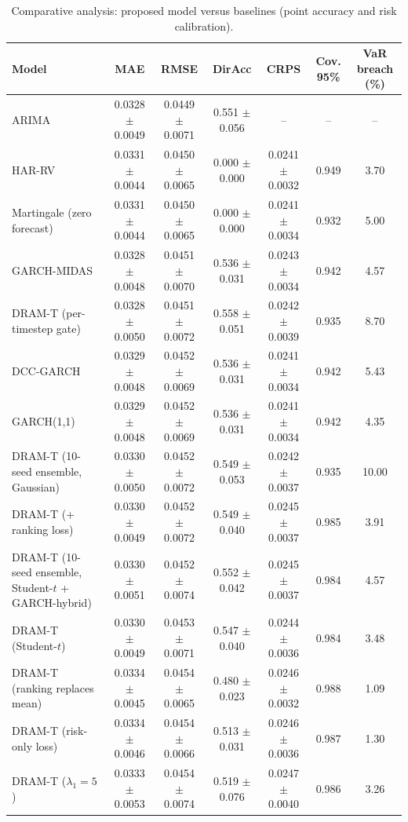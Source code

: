 \begin{table}
\caption{Comparative analysis: proposed model versus baselines (point accuracy and risk calibration).}
\label{tab:comparison}
\begin{tabular}{lcccccc}
\toprule
Model & MAE & RMSE & DirAcc & CRPS & Cov. 95\% & VaR breach (\%) \\
\midrule
ARIMA & 0.0328 $\pm$ 0.0049 & 0.0449 $\pm$ 0.0071 & 0.551 $\pm$ 0.056 & -- & -- & -- \\
HAR-RV & 0.0331 $\pm$ 0.0044 & 0.0450 $\pm$ 0.0065 & 0.000 $\pm$ 0.000 & 0.0241 $\pm$ 0.0032 & 0.949 & 3.70 \\
Martingale (zero forecast) & 0.0331 $\pm$ 0.0044 & 0.0450 $\pm$ 0.0065 & 0.000 $\pm$ 0.000 & 0.0241 $\pm$ 0.0034 & 0.932 & 5.00 \\
GARCH-MIDAS & 0.0328 $\pm$ 0.0048 & 0.0451 $\pm$ 0.0070 & 0.536 $\pm$ 0.031 & 0.0243 $\pm$ 0.0034 & 0.942 & 4.57 \\
DRAM-T (per-timestep gate) & 0.0328 $\pm$ 0.0050 & 0.0451 $\pm$ 0.0072 & 0.558 $\pm$ 0.051 & 0.0242 $\pm$ 0.0039 & 0.935 & 8.70 \\
DCC-GARCH & 0.0329 $\pm$ 0.0048 & 0.0452 $\pm$ 0.0069 & 0.536 $\pm$ 0.031 & 0.0241 $\pm$ 0.0034 & 0.942 & 5.43 \\
GARCH(1,1) & 0.0329 $\pm$ 0.0048 & 0.0452 $\pm$ 0.0069 & 0.536 $\pm$ 0.031 & 0.0241 $\pm$ 0.0034 & 0.942 & 4.35 \\
DRAM-T (10-seed ensemble, Gaussian) & 0.0330 $\pm$ 0.0050 & 0.0452 $\pm$ 0.0072 & 0.549 $\pm$ 0.053 & 0.0242 $\pm$ 0.0037 & 0.935 & 10.00 \\
DRAM-T (+ ranking loss) & 0.0330 $\pm$ 0.0049 & 0.0452 $\pm$ 0.0072 & 0.549 $\pm$ 0.040 & 0.0245 $\pm$ 0.0037 & 0.985 & 3.91 \\
DRAM-T (10-seed ensemble, Student-$t$ + GARCH-hybrid) & 0.0330 $\pm$ 0.0051 & 0.0452 $\pm$ 0.0074 & 0.552 $\pm$ 0.042 & 0.0245 $\pm$ 0.0037 & 0.984 & 4.57 \\
DRAM-T (Student-$t$) & 0.0330 $\pm$ 0.0049 & 0.0453 $\pm$ 0.0071 & 0.547 $\pm$ 0.040 & 0.0244 $\pm$ 0.0036 & 0.984 & 3.48 \\
DRAM-T (ranking replaces mean) & 0.0334 $\pm$ 0.0045 & 0.0454 $\pm$ 0.0065 & 0.480 $\pm$ 0.023 & 0.0246 $\pm$ 0.0032 & 0.988 & 1.09 \\
DRAM-T (risk-only loss) & 0.0334 $\pm$ 0.0046 & 0.0454 $\pm$ 0.0066 & 0.513 $\pm$ 0.031 & 0.0246 $\pm$ 0.0036 & 0.987 & 1.30 \\
DRAM-T ($\lambda_1=5$) & 0.0333 $\pm$ 0.0053 & 0.0454 $\pm$ 0.0074 & 0.519 $\pm$ 0.076 & 0.0247 $\pm$ 0.0040 & 0.986 & 3.26 \\

\end{tabular}
\end{table}
